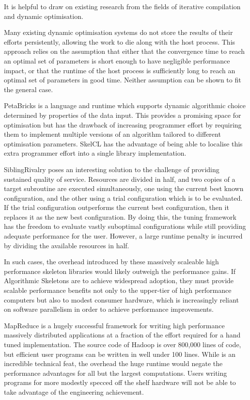 It is helpful to draw on existing research from the fields of
iterative compilation and dynamic optimisation.

Many existing dynamic optimisation systems do not store the results of
their efforts persistently, allowing the work to die along with the
host process. This approach relies on the assumption that either that
the convergence time to reach an optimal set of parameters is short
enough to have negligible performance impact, or that the runtime of
the host process is sufficiently long to reach an optimal set of
parameters in good time. Neither assumption can be shown to fit the
general case.

PetaBricks is a language and runtime which supports dynamic
algorithmic choice determined by properties of the data input. This
provides a promising space for optimisation but has the drawback of
increasing programmer effort by requiring them to implement multiple
versions of an algorithm tailored to different optimisation
parameters. SkelCL has the advantage of being able to localise this
extra programmer effort into a single library implementation.

SiblingRivalry poses an interesting solution to the challenge of
providing sustained quality of service. Resources are divided in half,
and two copies of a target subroutine are executed simultaneously, one
using the current best known configuration, and the other using a
trial configuration which is to be evaluated. If the trial
configuration outperforms the current best configuration, then it
replaces it as the new best configuration. By doing this, the tuning
framework has the freedom to evaluate vastly suboptimal configurations
while still providing adequate performance for the user. However, a
large runtime penalty is incurred by dividing the available resources
in half.

In such cases, the overhead introduced by these massively scaleable
high performance skeleton libraries would likely outweigh the
performance gains. If Algorithmic Skeletons are to achieve widespread
adoption, they must provide scalable performance benefits not only to
the upper-tier of high performance computers but also to modest
consumer hardware, which is increasingly reliant on software
parallelism in order to achieve performance improvements.

MapReduce is a hugely successful framework for writing high
performance massively distributed applications at a fraction of the
effort required for a hand tuned implementation. The source code of
Hadoop is over 800,000 lines of code, but efficient user programs can
be written in well under 100 lines. While is an incredible technical
feat, the overhead the huge runtime would negate the performance
advantages for all but the largest computations. Users writing
programs for more modestly specced off the shelf hardware will not be
able to take advantage of the engineering achievement.

